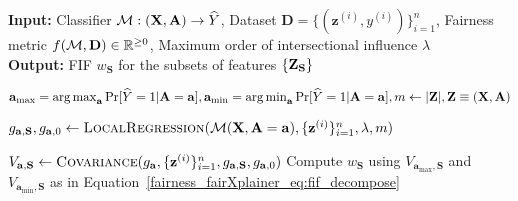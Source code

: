 \begin{algorithm}[t!]
	\caption{{\fairXplainer}}\label{fairness_fairXplainer_algo:framework}
	\begin{flushleft}
	\hspace*{\algorithmicindent}\textbf{Input:} Classifier $ \mathcal{M}: (\mathbf{X}, \mathbf{A}) \rightarrow \widehat{Y}$, Dataset $\mathbf{D} = \{(\mathbf{z}^{(i)}, y^{(i)})\}_{i=1}^n$, Fairness metric $f(\mathcal{M}, \mathbf{D}) \in \mathbb{R}^{\geq 0}$, Maximum order of intersectional influence $\lambda $\\
	\hspace*{\algorithmicindent}\textbf{Output:} FIF $ w_{\mathbf{S}}$ for the subsets of features $\{\mathbf{Z}_{\mathbf{S}}\}$
	\end{flushleft}

	\begin{algorithmic}[1]
		\State $ \mathbf{a}_{\max} = \operatorname*{arg\,max}_{\mathbf{a}} \Pr[\widehat{Y} = 1 | \mathbf{A} = \mathbf{a}], \mathbf{a}_{\min} = \operatorname*{arg\,min}_{\mathbf{a}} \Pr[\widehat{Y} = 1 | \mathbf{A} = \mathbf{a}], m \gets    |\mathbf{Z}|, \mathbf{Z} \equiv (\mathbf{X}, \mathbf{A}) $
		\label{fairness_fairXplainer_algo_line:fif_computation_start}
		
		 
		\State $ g_{\mathbf{a}, \mathbf{S}},g_{\mathbf{a}, 0} \gets \textsc{LocalRegression}(\mathcal{M}(\mathbf{X}, \mathbf{A} = \mathbf{a}), \{\mathbf{z}^{(i)}\}_{i=1}^n, \lambda, m) $
		
		\State $ V_{\mathbf{a}, \mathbf{S}} \gets \textsc{Covariance}(g_{\mathbf{a}},  \{\mathbf{z}^{(i)}\}_{i=1}^n, g_{\mathbf{a}, \mathbf{S}},g_{\mathbf{a}, 0}) $
		\EndFor
		\State Compute $ w_{\mathbf{S}}$ using  $V_{\mathbf{a}_{\max},\mathbf{S}}$ and $V_{\mathbf{a}_{\min},\mathbf{S}}$ as in Equation~\eqref{fairness_fairXplainer_eq:fif_decompose}
		\label{fairness_fairXplainer_algo_line:fif_computation_end}
		

\end{algorithmic}
\end{algorithm}
